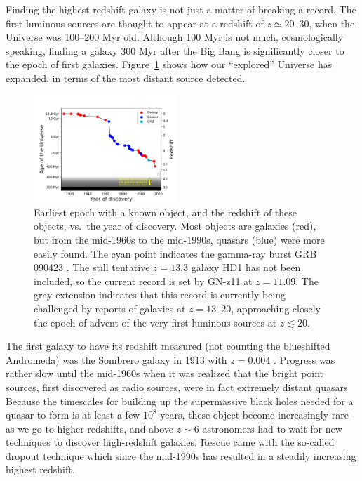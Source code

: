 \documentclass[useAMS,usenatbib,bibyear]{aa}
\begin{document}
Finding the highest-redshift galaxy is not just a matter of breaking a record. The first luminous sources are thought to appear at a redshift of $z\simeq20\text{--}30$, when the Universe was 100--200 Myr old.
Although 100 Myr is not much, cosmologically speaking, finding a galaxy 300 Myr after the Big Bang is significantly closer to the epoch of first galaxies.
Figure~\ref{fig:zrecord} shows how our ``explored'' Universe has expanded, in terms of the most distant source detected.
\begin{figure}[!t]
    \centering
    \includegraphics [width=0.48\textwidth] {zrecord.pdf}
    \caption{Earliest epoch with a known object, and the redshift of these objects, vs.~the year of discovery.
    Most objects are galaxies (red), but from the mid-1960s to the mid-1990s, quasars (blue) were more easily found. The cyan point indicates the gamma-ray burst GRB 090423 \citep{Tanvir2009}.
    The still tentative $z=13.3$ galaxy HD1 \citep{Harikane2022a} has not been included, so the current record is set by GN-z11 at $z=11.09$.
    The gray extension indicates that this record is currently being challenged by reports of galaxies at $z=13\text{--}20$, approaching closely the epoch of advent of the very first luminous sources at $z\lesssim20$.}
    \label{fig:zrecord}
\end{figure}
The first galaxy to have its redshift measured (not counting the blueshifted Andromeda) was the Sombrero galaxy in 1913 with $z=0.004$ \citep{Slipher1915,Hoyt1980}. Progress was rather slow until the mid-1960s when it was realized that the bright point sources, first discovered as radio sources, were in fact extremely distant quasars \citep{Schmidt1964,Schmidt1965}
Because the timescales for building up the supermassive black holes needed for a quasar to form is at least a few $10^8$ years, these object become increasingly rare as we go to higher redshifts, and above $z\sim6$ astronomers had to wait for new techniques to discover high-redshift galaxies.
Rescue came with the so-called dropout technique \citep{Steidel1996} which since the mid-1990s has resulted in a steadily increasing highest redshift.
\end{document}
